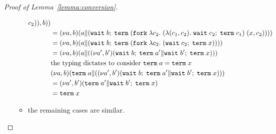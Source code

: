 \begin{proof}[Proof of Lemma~\ref{lemma:conversion}]
\begin{enumerate}
\begin{itemize}
\begin{align*}
{{        c_2) }), b)}) \\
        &=
          \PScope
          (\PPar a {(\ELetU {\EWait {b}} {\ETerm {(\EFork{ \ELam {c_2} (\ELam {(c_1, c_2)} \ELetU {\EWait {c_2}} {\ETerm {c_1}}) \; (x,
        c_2) })}})}) \\
        &=
          \PScope
          (\PPar a {(\ELetU {\EWait {b}} {\ETerm {(\EFork{ \ELam {c_2} (\ELetU {\EWait {c_2}} {\ETerm {x}}) })}})}) \\
        &=
          \PScope
          (\PPar a {(\PScope[a',b'] \PPar {(\ELetU {\EWait {b}} {\ETerm
          {a'}}} {{ \ELetU {\EWait {b'}} {\ETerm {x}}) }})}) \\
        & \text{the typing dictates to consider }\ETerm a = \ETerm x \\
        & \PScope (\PPar {\ETerm a} {(\PScope[a',b'] \PPar {(\ELetU {\EWait {b}} {\ETerm
          {a'}}} {{ \ELetU {\EWait {b'}} {\ETerm {x}}) }})}) \\
        &=\PScope[a',b'] \PPar {({\ETerm
          {a'}}} {{ \ELetU {\EWait {b'}} {\ETerm {x}}) }} \\
        &=  \ETerm {x}
      \end{align*}
    \item the remaining cases are similar.
    \end{itemize}
  \end{enumerate}
\end{proof}




